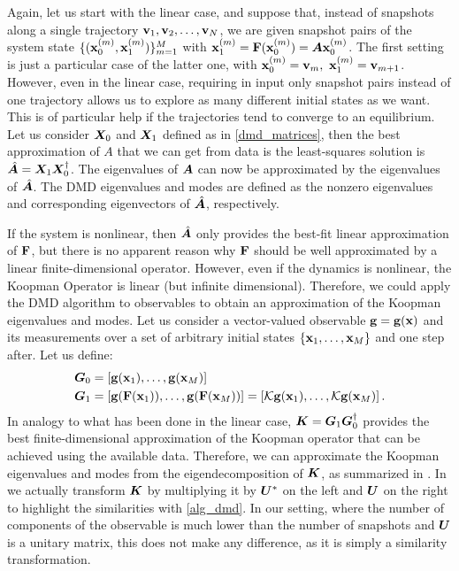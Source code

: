 Again, let us start with the linear case, and suppose that, instead of snapshots along a single trajectory $\vb{v}_1, \vb{v}_2, \dots, \vb{v}_N$, we are given snapshot pairs of the system state $\{(\vb{x}_0^{(m)}, \vb{x}_1^{(m)})\}_{m = 1}^M$ with $\vb{x}_1^{(m)} = \vb{F}(\vb{x}_0^{(m)}) = \vb*{A}\vb{x}_0^{(m)}$. The first setting is just a particular case of the latter one, with $\vb{x}_0^{(m)} = \vb{v}_m,\,\,\vb{x}_1^{(m)} = \vb{v}_{m+1}$. However, even in the linear case, requiring in input only snapshot pairs instead of one trajectory allows us to explore as many different initial states as we want. This is of particular help if the trajectories tend to converge to an equilibrium. Let us consider $\vb*{X}_0$ and $\vb*{X}_1$ defined as in \eqref{dmd_matrices}, then the best approximation of $A$ that we can get from data is the least-squares solution is $\hat{\vb*{A}} = \vb*{X}_1\vb*{X}_0^{\dagger}$. The eigenvalues of $\vb*{A}$ can now be approximated by the eigenvalues of $\hat{\vb*{A}}$. The DMD eigenvalues and modes are defined as the nonzero eigenvalues and corresponding eigenvectors of $\hat{\vb*{A}}$, respectively.

If the system is nonlinear, then $\hat{\vb*{A}}$ only provides the best-fit linear approximation of $\vb{F}$, but there is no apparent reason why $\vb{F}$ should be well approximated by a linear finite-dimensional operator. However, even if the dynamics is nonlinear, the Koopman Operator is linear (but infinite dimensional). Therefore, we could apply the DMD algorithm to observables to obtain an approximation of the Koopman eigenvalues and modes. Let us consider a vector-valued observable $\vb{g} = \vb{g}(\vb{x})$ and its measurements over a set of arbitrary initial states $\{\vb{x}_1,\dots, \vb{x}_M\}$ and one step after. Let us define:
\begin{equation}
    \label{dmd_koopman_matrices}
    \begin{split}
        \vb*{G}_0 &= \left[\vb{g}(\vb{x}_1), \dots, \vb{g}(\vb{x}_M)\right] \\
        \vb*{G}_1 &= \left[\vb{g}(\vb{F}(\vb{x}_1)), \dots, \vb{g}(\vb{F}(\vb{x}_M))\right] = \left[\mathcal{K}\vb{g}(\vb{x}_1), \dots, \mathcal{K}\vb{g}(\vb{x}_M)\right].\\
    \end{split}
\end{equation}
In analogy to what has been done in the linear case, $\vb*{K} = \vb*{G}_1\vb*{G}_0^{\dagger}$ provides the best finite-dimensional approximation of the Koopman operator that can be achieved using the available data. Therefore, we can approximate the Koopman eigenvalues and modes from the eigendecomposition of $\vb*{K}$, as summarized in . In  we actually transform $\vb*{K}$ by multiplying it by $\vb*{U}^*$ on the left and $\vb*{U}$ on the right to highlight the similarities with \cref{alg_dmd}. In our setting, where the number of components of the observable is much lower than the number of snapshots and $\vb*{U}$ is a unitary matrix, this does not make any difference, as it is simply a similarity transformation.

